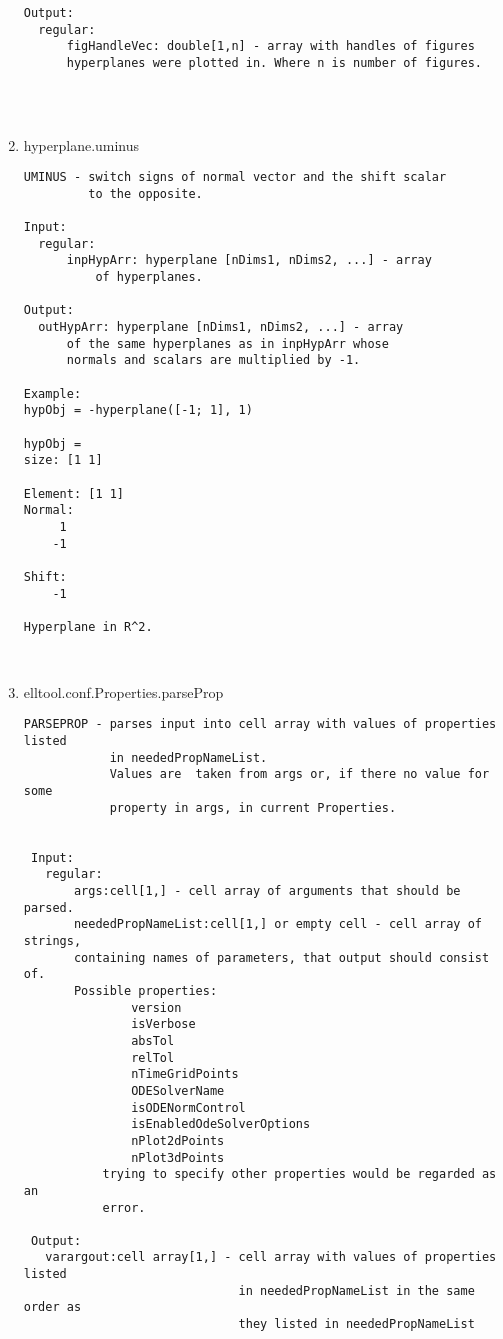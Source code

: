 \begin{enumerate}
\begin{lstlisting}
Output:
  regular:
      figHandleVec: double[1,n] - array with handles of figures
      hyperplanes were plotted in. Where n is number of figures.




\end{lstlisting}
\fontfamily{\familydefault}
\selectfont
\item {hyperplane.uminus}
\selectfont
\begin{lstlisting}
UMINUS - switch signs of normal vector and the shift scalar
         to the opposite.

Input:
  regular:
      inpHypArr: hyperplane [nDims1, nDims2, ...] - array
          of hyperplanes.

Output:
  outHypArr: hyperplane [nDims1, nDims2, ...] - array
      of the same hyperplanes as in inpHypArr whose
      normals and scalars are multiplied by -1.

Example:
hypObj = -hyperplane([-1; 1], 1)

hypObj =
size: [1 1]

Element: [1 1]
Normal:
     1
    -1

Shift:
    -1

Hyperplane in R^2.



\end{lstlisting}
\fontfamily{\familydefault}
\selectfont
\item {elltool.conf.Properties.parseProp}
\selectfont
\begin{lstlisting}
PARSEPROP - parses input into cell array with values of properties listed
            in neededPropNameList.
            Values are  taken from args or, if there no value for some
            property in args, in current Properties.


 Input:
   regular:
       args:cell[1,] - cell array of arguments that should be parsed.
       neededPropNameList:cell[1,] or empty cell - cell array of strings,
       containing names of parameters, that output should consist of.
       Possible properties:
               version
               isVerbose
               absTol
               relTol
               nTimeGridPoints
               ODESolverName
               isODENormControl
               isEnabledOdeSolverOptions
               nPlot2dPoints
               nPlot3dPoints
           trying to specify other properties would be regarded as an
           error.

 Output:
   varargout:cell array[1,] - cell array with values of properties listed
                              in neededPropNameList in the same order as
                              they listed in neededPropNameList


\end{lstlisting}
\end{enumerate}
